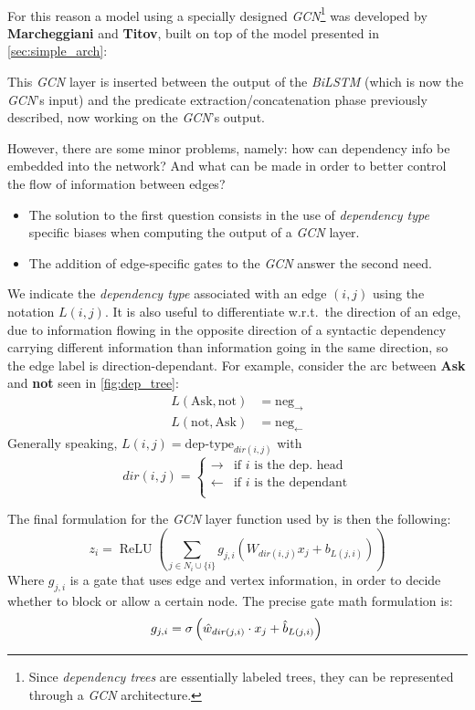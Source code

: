 \documentclass[a4paper,10pt,twocolumn]{article}
\newcommand{\BiLSTM}{\emph{BiLSTM}}
\newcommand{\GCN}{\emph{GCN}}
\begin{document}
\paragraph{}
For this reason a model using a specially designed \GCN{}\footnote{Since \emph{dependency trees} are essentially labeled trees, they can be represented through  a \GCN{} architecture. } was developed by \textbf{Marcheggiani} and \textbf{Titov}, built on top of the model presented in \cref{sec:simple_arch}: 

This \GCN{} layer is inserted between the output of the \BiLSTM{} (which is now the \GCN{}'s input) and the predicate extraction/concatenation phase previously described, now working on the \GCN{}'s output.


However, there are some minor problems, namely: how can  dependency info be embedded into the network? And what can be made in order to better control the flow of information between edges? 
\begin{itemize}
\item The solution to the first question consists in the use of \emph{dependency type} specific biases when computing the output of a \GCN{} layer.
\item The addition of edge-specific gates to the \GCN{} answer the second need.
\end{itemize}

We indicate the \emph{dependency type} associated with an edge $(i,j)$ using the notation $L(i,j)$.  It is also useful to differentiate w.r.t.\ the direction of an edge, due to information flowing in the opposite direction  of a syntactic dependency  carrying different information than information going in the same direction, so the edge label is direction-dependant.
For example, consider the arc between \textbf{Ask} and \textbf{not} seen in \cref{fig:dep_tree}:
\begin{align*}
L(\mathrm{Ask},\mathrm{not}) &= \mathrm{neg}_\rightarrow\\
L(\mathrm{not},\mathrm{Ask}) &= \mathrm{neg}_\leftarrow
\end{align*}
Generally speaking, $L(i,j) = \text{dep-type}_{dir(i,j)}$ with
$$
dir(i,j) = 	\begin{cases}
				\rightarrow & \text{if $i$ is the dep. head}\\
				\leftarrow & \text{if $i$ is the dependant}\\
				\end{cases}
$$

The final formulation for the \GCN{} layer function used by is then the following:
$$
z_i = \mathop{\mathrm{ReLU}}\left(\sum_{j \in N_i\cup\{i\}}g_{j,i}\left(W_{dir(i,j)} x_j + b_{L(j,i)}\right)\right)
$$
Where $g_{j,i}$ is a gate that uses edge and vertex information, in order to decide whether to block or allow a certain node.
The precise gate math formulation is: 
$$
g_{j,i} =\sigma \left( \hat{w}_{dir(j,i)}\cdot x_j + \hat b_{L(j,i)} \right)\\ 
$$
\end{document}
